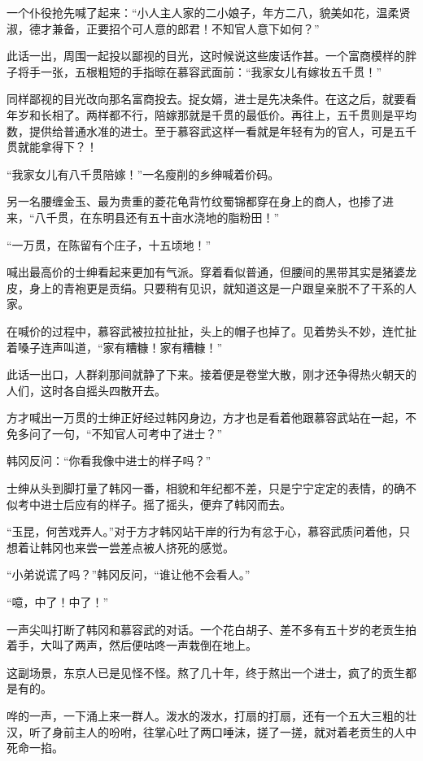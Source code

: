 一个仆役抢先喊了起来：“小人主人家的二小娘子，年方二八，貌美如花，温柔贤淑，德才兼备，正要招个可人意的郎君！不知官人意下如何？”

此话一出，周围一起投以鄙视的目光，这时候说这些废话作甚。一个富商模样的胖子将手一张，五根粗短的手指晾在慕容武面前：“我家女儿有嫁妆五千贯！”

同样鄙视的目光改向那名富商投去。捉女婿，进士是先决条件。在这之后，就要看年岁和长相了。两样都不行，陪嫁那就是千贯的最低价。再往上，五千贯则是平均数，提供给普通水准的进士。至于慕容武这样一看就是年轻有为的官人，可是五千贯就能拿得下？！

“我家女儿有八千贯陪嫁！”一名瘦削的乡绅喊着价码。

另一名腰缠金玉、最为贵重的菱花龟背竹纹蜀锦都穿在身上的商人，也掺了进来，“八千贯，在东明县还有五十亩水浇地的脂粉田！”

“一万贯，在陈留有个庄子，十五顷地！”

喊出最高价的士绅看起来更加有气派。穿着看似普通，但腰间的黑带其实是猪婆龙皮，身上的青袍更是贡绢。只要稍有见识，就知道这是一户跟皇亲脱不了干系的人家。

在喊价的过程中，慕容武被拉拉扯扯，头上的帽子也掉了。见着势头不妙，连忙扯着嗓子连声叫道，“家有糟糠！家有糟糠！”

此话一出口，人群刹那间就静了下来。接着便是卷堂大散，刚才还争得热火朝天的人们，这时各自摇头四散开去。

方才喊出一万贯的士绅正好经过韩冈身边，方才也是看着他跟慕容武站在一起，不免多问了一句，“不知官人可考中了进士？”

韩冈反问：“你看我像中进士的样子吗？”

士绅从头到脚打量了韩冈一番，相貌和年纪都不差，只是宁宁定定的表情，的确不似考中进士后应有的样子。摇了摇头，便弃了韩冈而去。

“玉昆，何苦戏弄人。”对于方才韩冈站干岸的行为有忿于心，慕容武质问着他，只想着让韩冈也来尝一尝差点被人挤死的感觉。

“小弟说谎了吗？”韩冈反问，“谁让他不会看人。”

“噫，中了！中了！”

一声尖叫打断了韩冈和慕容武的对话。一个花白胡子、差不多有五十岁的老贡生拍着手，大叫了两声，然后便咕咚一声栽倒在地上。

这副场景，东京人已是见怪不怪。熬了几十年，终于熬出一个进士，疯了的贡生都是有的。

哗的一声，一下涌上来一群人。泼水的泼水，打扇的打扇，还有一个五大三粗的壮汉，听了身前主人的吩咐，往掌心吐了两口唾沫，搓了一搓，就对着老贡生的人中死命一掐。

